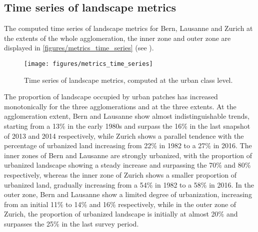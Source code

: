 \subsection*{Time series of landscape metrics}

The computed time series of landscape metrics for Bern, Lausanne and Zurich at the extents of the whole agglomeration, the inner zone and outer zone are displayed in \autoref{figures/metrics_time_series} (see ).

\begin{figure}[!ht]
  \begin{adjustwidth}{0cm}{-.3\textwidth}
    \centering
    \texttt{[image: figures/metrics\_time\_series]}
    
    \caption[Time series of landscape metrics]{\label{figures/metrics_time_series}Time series of landscape metrics, computed at the urban class level.}
  \end{adjustwidth}
\end{figure}

The proportion of landscape occupied by urban patches has increased monotonically for the three agglomerations and at the three extents.
At the agglomeration extent, Bern and Lausanne show almost indistinguishable trends, starting from a 13\% in the early 1980s and surpass the 16\% in the last snapshot of 2013 and 2014 respectively, while Zurich shows a parallel tendence with the percentage of urbanized land increasing from 22\% in 1982 to a 27\% in 2016.
The inner zones of Bern and Lausanne are strongly urbanized, with the proportion of urbanized landscape showing a steady increase and surpassing the 70\% and 80\% respectively, whereas the inner zone of Zurich shows a smaller proportion of urbanized land, gradually increasing from a 54\% in 1982 to a 58\% in 2016.
In the outer zone, Bern and Lausanne show a limited degree of urbanization, increasing from an initial 11\% to 14\% and 16\% respectively, while in the outer zone of Zurich, the proportion of urbanized landscape is initially at almost 20\% and surpasses the 25\% in the last survey period.

